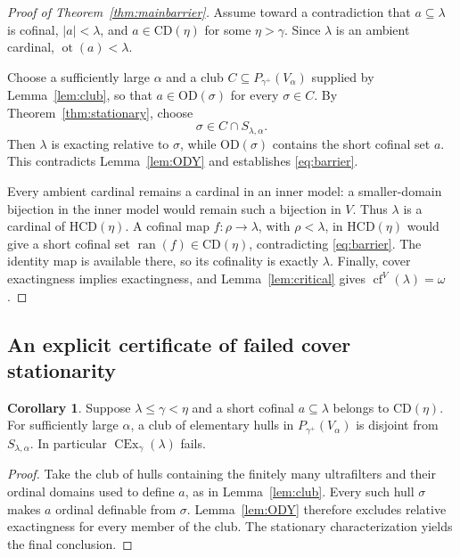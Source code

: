 \documentclass[11pt,letterpaper]{article}
\theoremstyle{definition}
\newtheorem{corollary}[definition]{Corollary}
\newcommand{\OD}{\mathrm{OD}}
\newcommand{\CEx}{\operatorname{CEx}}
\newcommand{\cf}{\operatorname{cf}}
\newcommand{\ot}{\operatorname{ot}}
\newcommand{\CD}{\mathrm{CD}}
\newcommand{\HCD}{\mathrm{HCD}}
\newcommand{\ran}{\operatorname{ran}}
\numberwithin{equation}{section}
\begin{document}
\begin{proof}[Proof of Theorem~\ref{thm:mainbarrier}]
Assume toward a contradiction that $a\subseteq\lambda$ is cofinal, $|a|<\lambda$, and $a\in\CD(\eta)$ for some $\eta>\gamma$. Since $\lambda$ is an ambient cardinal, $\ot(a)<\lambda$.

Choose a sufficiently large $\alpha$ and a club $C\subseteq P_{\gamma^+}(V_\alpha)$ supplied by Lemma~\ref{lem:club}, so that $a\in\OD(\sigma)$ for every $\sigma\in C$. By Theorem~\ref{thm:stationary}, choose
\[
 \sigma\in C\cap S_{\lambda,\alpha}.
\]
Then $\lambda$ is exacting relative to $\sigma$, while $\OD(\sigma)$ contains the short cofinal set $a$. This contradicts Lemma~\ref{lem:ODY} and establishes \eqref{eq:barrier}.

Every ambient cardinal remains a cardinal in an inner model: a smaller-domain bijection in the inner model would remain such a bijection in $V$. Thus $\lambda$ is a cardinal of $\HCD(\eta)$. A cofinal map $f:\rho\to\lambda$, with $\rho<\lambda$, in $\HCD(\eta)$ would give a short cofinal set $\ran(f)\in\CD(\eta)$, contradicting \eqref{eq:barrier}. The identity map is available there, so its cofinality is exactly $\lambda$. Finally, cover exactingness implies exactingness, and Lemma~\ref{lem:critical} gives $\cf^V(\lambda)=\omega$.
\end{proof}

\subsection{An explicit certificate of failed cover stationarity}

\begin{corollary}\label{cor:certificate}
Suppose $\lambda\leq\gamma<\eta$ and a short cofinal $a\subseteq\lambda$ belongs to $\CD(\eta)$. For sufficiently large $\alpha$, a club of elementary hulls in $P_{\gamma^+}(V_\alpha)$ is disjoint from $S_{\lambda,\alpha}$. In particular $\CEx_\gamma(\lambda)$ fails.
\end{corollary}

\begin{proof}
Take the club of hulls containing the finitely many ultrafilters and their ordinal domains used to define $a$, as in Lemma~\ref{lem:club}. Every such hull $\sigma$ makes $a$ ordinal definable from $\sigma$. Lemma~\ref{lem:ODY} therefore excludes relative exactingness for every member of the club. The stationary characterization yields the final conclusion.
\end{proof}
\end{document}
